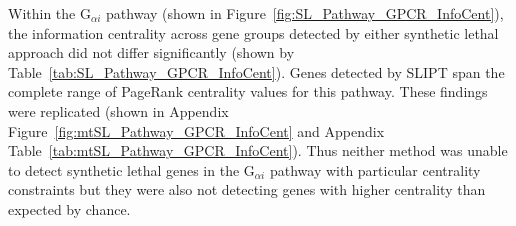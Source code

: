 
Within the G$_{\alpha i}$ \gls{pathway} (shown in Figure~\ref{fig:SL_Pathway_GPCR_InfoCent}), the \gls{information centrality} across gene groups detected by either \gls{synthetic lethal} approach did not differ significantly (shown by Table~\ref{tab:SL_Pathway_GPCR_InfoCent}). %
Genes detected by \gls{SLIPT} span the complete range of \gls{PageRank centrality} values for this \gls{pathway}. %
%
These findings were replicated (shown in Appendix Figure~\ref{fig:mtSL_Pathway_GPCR_InfoCent} %
and Appendix Table~\ref{tab:mtSL_Pathway_GPCR_InfoCent}). Thus neither method was unable to detect \gls{synthetic lethal} genes in the G$_{\alpha i}$ \gls{pathway} with particular \gls{centrality} constraints but they were also not detecting genes with higher \gls{centrality} than expected by chance. 

